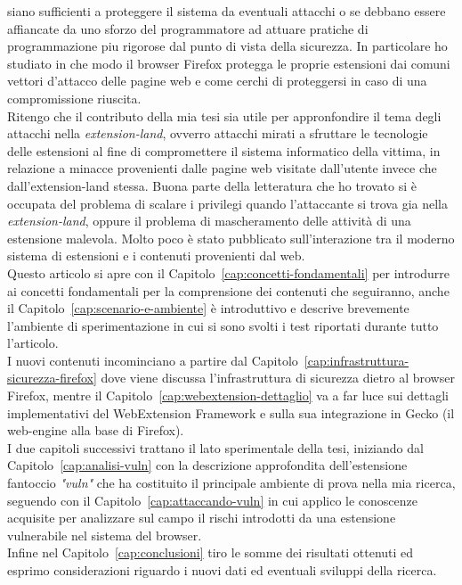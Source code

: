 \documentclass{sapthesis}
\newcommand{\refChapter}[1]{Capitolo~\ref{#1}}
\newcommand{\vuln}{\textit{"vuln"}}
\begin{document}
    siano sufficienti a proteggere il sistema da eventuali attacchi o se debbano essere affiancate
    da uno sforzo del programmatore ad attuare pratiche di programmazione piu rigorose dal punto
    di vista della sicurezza. In particolare ho studiato in che modo il browser Firefox
    protegga le proprie estensioni dai comuni vettori d'attacco delle pagine web e come cerchi
    di proteggersi in caso di una compromissione riuscita.\\
    Ritengo che il contributo della mia tesi sia utile per appronfondire il tema degli attacchi
    nella \textit{extension-land}, ovverro attacchi mirati a sfruttare le tecnologie delle estensioni
    al fine di compromettere il sistema informatico della vittima, in relazione a minacce
    provenienti dalle pagine web visitate dall'utente invece che dall'extension-land stessa. 
    Buona parte della letteratura che ho trovato si è occupata del problema di scalare i
    privilegi quando l'attaccante si trova gia nella \textit{extension-land}, oppure il problema di mascheramento
    delle attività di una estensione malevola. Molto poco è stato pubblicato sull'interazione tra
    il moderno sistema di estensioni e i contenuti provenienti dal web.\\
    Questo articolo si apre con il \refChapter{cap:concetti-fondamentali} per introdurre ai
    concetti fondamentali per la comprensione dei contenuti che seguiranno, anche il \refChapter{cap:scenario-e-ambiente}
    è introduttivo e descrive brevemente l'ambiente di sperimentazione in cui si sono svolti i test
    riportati durante tutto l'articolo.\\ 
    I nuovi contenuti incominciano a partire dal \refChapter{cap:infrastruttura-sicurezza-firefox}
    dove viene discussa l'infrastruttura di sicurezza dietro al browser Firefox, mentre il \refChapter{cap:webextension-dettaglio}
    va a far luce sui dettagli implementativi del WebExtension Framework e sulla sua integrazione
    in Gecko (il web-engine alla base di Firefox).\\
    I due capitoli successivi trattano il lato sperimentale della tesi, iniziando dal \refChapter{cap:analisi-vuln} con la descrizione
    approfondita dell'estensione fantoccio \vuln{} che ha costituito il principale ambiente 
    di prova nella mia ricerca, seguendo con il \refChapter{cap:attaccando-vuln} in cui applico
    le conoscenze acquisite per analizzare sul campo il rischi introdotti da una estensione vulnerabile
    nel sistema del browser.\\
    Infine nel \refChapter{cap:conclusioni} tiro le somme dei risultati ottenuti ed esprimo
    considerazioni riguardo i nuovi dati ed eventuali sviluppi della ricerca.
\end{document}
